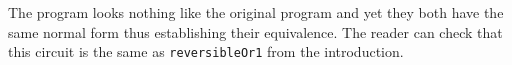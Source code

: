 \adder{}

\noindent The  program looks nothing like the original  program and yet they both have the
same normal form thus establishing their equivalence. The reader can check that this circuit is the same as
\verb|reversibleOr1| from the introduction.



